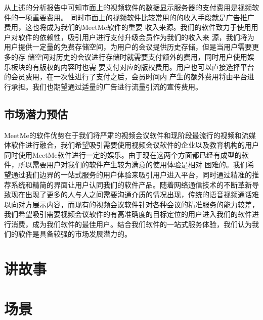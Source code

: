 \documentclass[a4paper,12pt]{article}
\begin{document}
从上述的分析报告中可知市面上的视频软件的数据显示服务器的支付费用是视频软件的一项重要费用。
同时市面上的视频软件比较常用的的收入手段就是广告推广费用，这也将成为我们的MeetMe软件的重要
收入来源。我们的软件致力于使用用户对软件的依赖性，吸引用户进行支付升级会员作为我们的收入来
源，我们将为用户提供一定量的免费存储空间，为用户的会议提供历史存储，但是当用户需要更多的存
储空间对历史的会议进行存储时就需要支付额外的费用，同时用户使用娱乐板块的有版权的内容时也需
要支付对应的版权费用。用户也可以直接选择平台的会员费用，在一次性进行了支付之后，会员时间内
产生的额外费用将由平台进行承担。我们也期望通过适量的广告进行流量引流的宣传费用。
\subsection{市场潜力预估}
MeetMe的软件优势在于我们将严肃的视频会议软件和现阶段最流行的视频和流媒体软件进行融合，我们希望吸引需要使用视频会议软件的企业以及教育机构的用户同时使用MeetMe软件进行一定的娱乐。由于现在这两个方面都已经有成型的软件，所以需要用户对我们的软件产生较为满意的使用体验是相对
困难的。我们希望通过我们边界的一站式服务的用户体验来吸引用户进入平台，同时通过精准的推荐系统和精简的界面让用户认同我们的软件产品。随着网络通信技术的不断革新导致现在出现了更多的人与人之间需要沟通介质的情况出现，传统的语音视频通话难以向对方展示内容，而现有的视频会议软件针对各种会议的精准服务的能力较差，我们希望吸引需要视频会议软件的有高准确度的目标定位的用户进入我们的软件进行消费，成为我们软件的最佳用户。结合我们软件的一站式服务体验，我们认为我们的软件是具备较强的市场发展潜力的。
\section{讲故事}
\section{场景}
\end{document}
